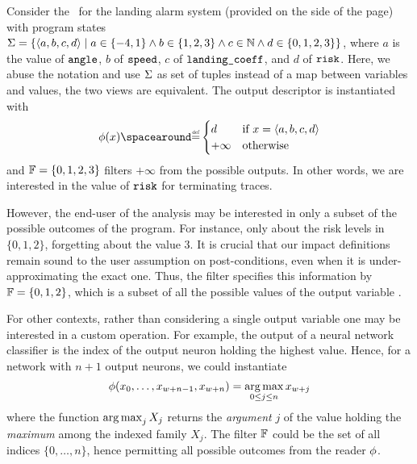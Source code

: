 \begin{example}

  Consider the~ for the landing alarm system (provided on the side of the page) with program states $\Sigma=\{\langle a, b, c, d \rangle \mid a\in\{-4,1\}\land b\in\{1,2,3\}\land c\in\mathbb{N} \land d\in\{0,1,2,3\}\}$, where $a$ is the value of $\texttt{angle}$, $b$ of $\texttt{speed}$, $c$ of $\texttt{landing\_coeff}$, and $d$ of $\texttt{risk}$.
  Here, we abuse the notation and use $\Sigma$ as set of tuples instead of a map between variables and values, the two views are equivalent.
  The output descriptor is instantiated with
  \[
  \reader(x) \DefeQ \begin{cases}
    d & \text{if } x = \langle a, b, c, d \rangle \\
    +\infty & \text{otherwise}
  \end{cases}
  \]
  and $\mathbb{F}=\{0,1,2,3\}$ filters $+\infty$ from the possible outputs.
  In other words, we are interested in the value of $\texttt{risk}$ for terminating traces.

  However, the end-user of the analysis may be interested in only a subset of the possible outcomes of the program.
  For instance, only about the risk levels in $\{0, 1, 2\}$, forgetting about the value $3$.
  It is crucial that our impact definitions remain sound to the user assumption on post-conditions, even when it is under-approximating the exact one.
  Thus, the filter specifies this information by $\mathbb{F}=\{0, 1, 2\}$, which is a subset of all the possible values of the output variable \z.
\end{example}

\begin{example}
  For other contexts, rather than considering a single output variable one may be interested in a custom operation.
  For example, the output of a neural network classifier is the index of the output neuron holding the highest value.
  Hence, for a network with $n+1$ output neurons, we could instantiate
  \[
    \phi(x_0,\dots,x_{w+n-1},x_{w+n})=\operatorname*{arg\,max}_{0\le j\le n} x_{w+j}
  \] where the function $\operatorname*{arg\,max}_j X_j$ returns the \textit{argument} $j$ of the value holding the \textit{maximum} among the indexed family $X_j$.
  The filter $\mathbb{F}$ could be the set of all indices $\{0,\dots,n\}$, hence permitting all possible outcomes from the reader $\phi$.
\end{example}



